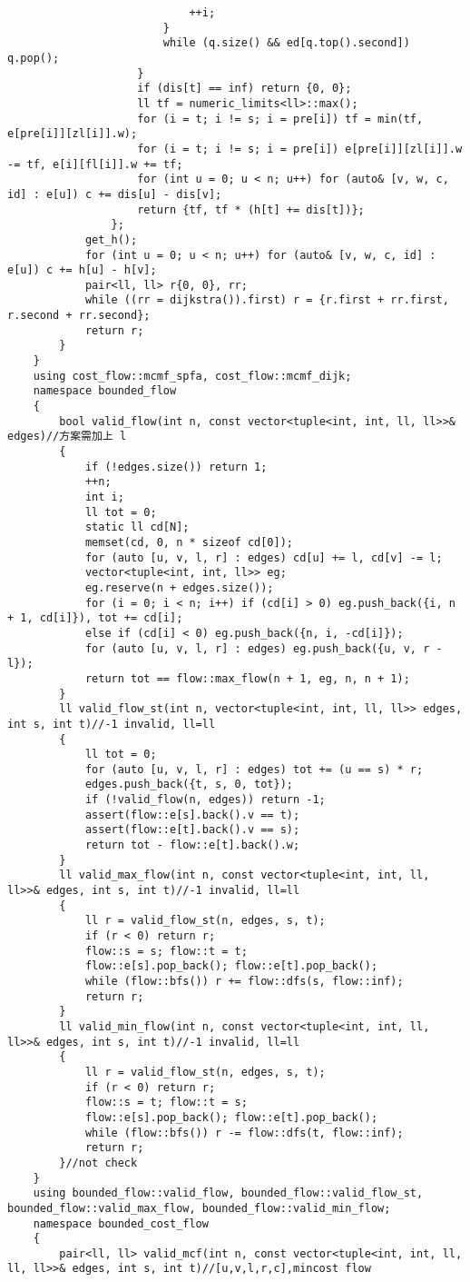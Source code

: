 \documentclass[12pt]{ctexart}
\begin{document}
\begin{lstlisting}
							++i;
						}
						while (q.size() && ed[q.top().second]) q.pop();
					}
					if (dis[t] == inf) return {0, 0};
					ll tf = numeric_limits<ll>::max();
					for (i = t; i != s; i = pre[i]) tf = min(tf, e[pre[i]][zl[i]].w);
					for (i = t; i != s; i = pre[i]) e[pre[i]][zl[i]].w -= tf, e[i][fl[i]].w += tf;
					for (int u = 0; u < n; u++) for (auto& [v, w, c, id] : e[u]) c += dis[u] - dis[v];
					return {tf, tf * (h[t] += dis[t])};
				};
			get_h();
			for (int u = 0; u < n; u++) for (auto& [v, w, c, id] : e[u]) c += h[u] - h[v];
			pair<ll, ll> r{0, 0}, rr;
			while ((rr = dijkstra()).first) r = {r.first + rr.first, r.second + rr.second};
			return r;
		}
	}
	using cost_flow::mcmf_spfa, cost_flow::mcmf_dijk;
	namespace bounded_flow
	{
		bool valid_flow(int n, const vector<tuple<int, int, ll, ll>>& edges)//方案需加上 l
		{
			if (!edges.size()) return 1;
			++n;
			int i;
			ll tot = 0;
			static ll cd[N];
			memset(cd, 0, n * sizeof cd[0]);
			for (auto [u, v, l, r] : edges) cd[u] += l, cd[v] -= l;
			vector<tuple<int, int, ll>> eg;
			eg.reserve(n + edges.size());
			for (i = 0; i < n; i++) if (cd[i] > 0) eg.push_back({i, n + 1, cd[i]}), tot += cd[i];
			else if (cd[i] < 0) eg.push_back({n, i, -cd[i]});
			for (auto [u, v, l, r] : edges) eg.push_back({u, v, r - l});
			return tot == flow::max_flow(n + 1, eg, n, n + 1);
		}
		ll valid_flow_st(int n, vector<tuple<int, int, ll, ll>> edges, int s, int t)//-1 invalid, ll=ll
		{
			ll tot = 0;
			for (auto [u, v, l, r] : edges) tot += (u == s) * r;
			edges.push_back({t, s, 0, tot});
			if (!valid_flow(n, edges)) return -1;
			assert(flow::e[s].back().v == t);
			assert(flow::e[t].back().v == s);
			return tot - flow::e[t].back().w;
		}
		ll valid_max_flow(int n, const vector<tuple<int, int, ll, ll>>& edges, int s, int t)//-1 invalid, ll=ll
		{
			ll r = valid_flow_st(n, edges, s, t);
			if (r < 0) return r;
			flow::s = s; flow::t = t;
			flow::e[s].pop_back(); flow::e[t].pop_back();
			while (flow::bfs()) r += flow::dfs(s, flow::inf);
			return r;
		}
		ll valid_min_flow(int n, const vector<tuple<int, int, ll, ll>>& edges, int s, int t)//-1 invalid, ll=ll
		{
			ll r = valid_flow_st(n, edges, s, t);
			if (r < 0) return r;
			flow::s = t; flow::t = s;
			flow::e[s].pop_back(); flow::e[t].pop_back();
			while (flow::bfs()) r -= flow::dfs(t, flow::inf);
			return r;
		}//not check
	}
	using bounded_flow::valid_flow, bounded_flow::valid_flow_st, bounded_flow::valid_max_flow, bounded_flow::valid_min_flow;
	namespace bounded_cost_flow
	{
		pair<ll, ll> valid_mcf(int n, const vector<tuple<int, int, ll, ll, ll>>& edges, int s, int t)//[u,v,l,r,c],mincost flow

\end{lstlisting}
\end{document}
